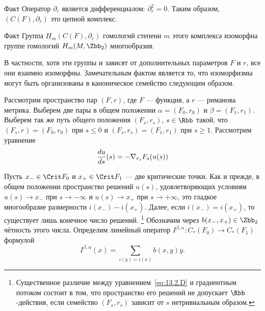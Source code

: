 \begin{thm}{Факт}\label{13.2.B}
  Оператор $\partial_{r}$ является дифференциалом: $\partial_{r}^{2}=0$.
  Таким образом, $(C(F),\partial_{r})$ это цепной комплекс. 
\end{thm}

\begin{thm}{Факт}\label{13.2.C}
  Группа $H_{m}(C(F),\partial_{r})$ гомологий степени $m$ этого
  комплекса изоморфна группе гомологий $H_{m}(M, \Zbb_{2})$ многообразия.
\end{thm}

В частности, хотя эти группы и зависят от дополнительных параметров
$F$ и $r$, все они взаимно изоморфны.
Замечательным фактом является то, что изоморфизмы могут быть
организованы в каноническое семейство следующим образом.

Рассмотрим пространство пар $(F, r)$, где $F$ --- функция, а $r$ ---
риманова метрика. 
Выберем две пары в общем положении $\alpha = (F_{0}, r_{0})$ и
$\beta = (F_{1},r_{1})$. Выберем так же путь общего положения
$(F_{s},r_{s})$, $s\in\Rbb$ такой, что
$(F_{s}, r_{}) = (F_{0}, r_{0})$ при $s\leq0$ и
$(F_{s}, r_{s}) = (F_{1},r_{1})$ при $s\geq1$.
Рассмотрим уравнение
\begin{equation}\label{eq:13.2.D}
  \frac{d u}{d s}(s)=-\nabla_{r_{s}}F_{s}(u(s))
\end{equation}

Пусть $x_{-}\in\Crit F_{0}$ и $x_{+}\in\Crit F_{1}$ --- две критические точки.
Как и прежде, в общем положении пространство решений $u(s)$,
удовлетворяющих условиям $u(s)\to x_{-}$ при $s\to-\infty$ и $u(s)\to
x_{+}$ при  $s\to+\infty$, это гладкое многообразие размерности
$i(x_{-})-i(x_{+})$.
Далее, если $i(x_{-}) = i(x_{+})$, то существует лишь конечное число
решений.%
\footnote{Существенное различие между уравнением~\ref{eq:13.2.D} и
  градиентным потоком состоит в том, что пространство его решений
  не допускает $\Rbb$-действия, если семейство $(F_{s},r_{s})$ зависит
  от $s$ нетривиальным образом.}
Обозначим через $b(x_{-},x_{+})\in\Zbb_{2}$ чётность этого числа.
Определим линейный оператор
$I^{\beta,\alpha} : C_{*}(F_{0})\to C_{*}(F_{1})$ формулой
\[
I^{\beta,\alpha}(x) = \sum_{i(y)=i(x)}b(x, y)y.
\]

